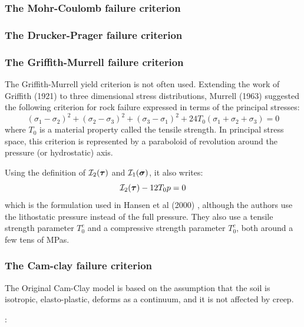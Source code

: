 \subsubsection{The Mohr-Coulomb failure criterion}


\subsubsection{The Drucker-Prager failure criterion}


\subsubsection{The Griffith-Murrell failure criterion}

The Griffith-Murrell yield criterion \cite{brau94,brbe95,babr97} is not often used. 
Extending the work of Griffith (1921) to three dimensional stress distributions, 
Murrell (1963) suggested the following criterion for rock failure expressed 
in terms of the principal stresses:
\[
(\sigma_1-\sigma_2)^2 + (\sigma_2-\sigma_3)^2 + (\sigma_3-\sigma_1)^2
+
24T_0 (\sigma_1+\sigma_2+\sigma_3)=0
\]
where $T_0$ is a material property called the tensile strength. In principal stress space, 
this criterion is represented by a paraboloid of revolution around the pressure (or hydrostatic) axis.

Using the definition of ${\cal I}_2({\bm \tau})$ and ${\cal I}_1({\bm \sigma})$, it also writes:
\[
{\cal I}_2({\bm \tau}) - 12 T_0 p =0
\]
which is the formulation used in Hansen et al (2000) \cite{hanl00}, although the authors
use the lithostatic pressure instead of the full pressure. They also use a tensile 
strength parameter $T_0^e$ and a compressive strength parameter $T_0^c$, both around a few tens 
of MPas.

\subsubsection{The Cam-clay failure criterion}

The Original Cam-Clay model is based on the assumption that the soil is isotropic, elasto-plastic, deforms as a continuum, and it is not affected by creep.

\Literature: \cite{pehu03}

